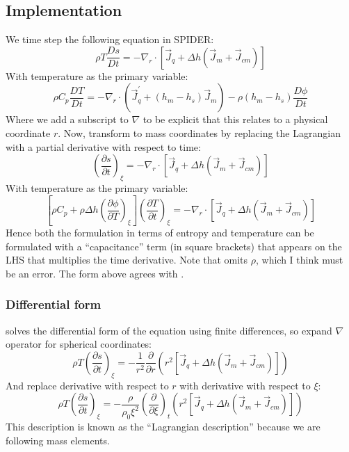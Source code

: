\subsection{Implementation}
We time step the following equation in SPIDER:
\begin{equation}
\rho T \frac{Ds}{Dt} = -\nabla_r \cdot \left[ \vec{J}_q + \Delta h (\vec{J}_m + \vec{J}_{cm}) \right]
\end{equation}
With temperature as the primary variable:
\begin{equation}
\rho C_p \frac{DT}{Dt} = - \nabla_r \cdot \left( \vec{J}_q^\prime + (h_m-h_s) \vec{J}_m \right) - \rho (h_m-h_s) \frac{D\phi}{Dt}
\end{equation}
Where we add a subscript to $\nabla$ to be explicit that this relates to a physical coordinate $r$.  Now, transform to mass coordinates by replacing the Lagrangian with a partial derivative with respect to time:
\begin{equation}
[\rho T] \left( \frac{\partial s}{\partial t} \right)_\xi = -\nabla_r \cdot \left[ \vec{J}_q + \Delta h (\vec{J}_m + \vec{J}_{cm}) \right]
\end{equation}
With temperature as the primary variable:
\begin{equation}
\left[ \rho C_p + \rho \Delta h \left(\frac{\partial \phi}{\partial T} \right)_\xi \right] \left( \frac{\partial T}{\partial t} \right)_\xi = -\nabla_r \cdot \left[ \vec{J}_q + \Delta h (\vec{J}_m + \vec{J}_{cm}) \right]
\end{equation}
Hence both the formulation in terms of entropy and temperature can be formulated with a ``capacitance'' term (in square brackets) that appears on the LHS that multiplies the time derivative.  Note that \cite[Eq.~21]{ABE93} omits $\rho$, which I think must be an error.  The form above agrees with \cite[Eq.~10 \& A12]{ABE95}.
\subsubsection{Differential form}
\cite{ABE93} solves the differential form of the equation using finite differences, so expand $\nabla$ operator for spherical coordinates:
\begin{equation}
\rho T \left( \frac{\partial s}{\partial t} \right)_\xi = -\frac{1}{r^2} \frac{\partial}{\partial r} \left( r^2 \left[ \vec{J}_q + \Delta h (\vec{J}_m + \vec{J}_{cm}) \right] \right)
\end{equation}
And replace derivative with respect to $r$ with derivative with respect to $\xi$:
\begin{equation}
\rho T \left( \frac{\partial s}{\partial t} \right)_\xi = - \frac{\rho}{\rho_0 \xi^2} \left(\frac{\partial}{\partial \xi} \right)_t \left( r^2 \left[ \vec{J}_q + \Delta h (\vec{J}_m + \vec{J}_{cm}) \right] \right)
\label{eq:finals}
\end{equation}
This description is known as the ``Lagrangian description'' \citep[e.g.,][]{KWW12} because we are following mass elements.
